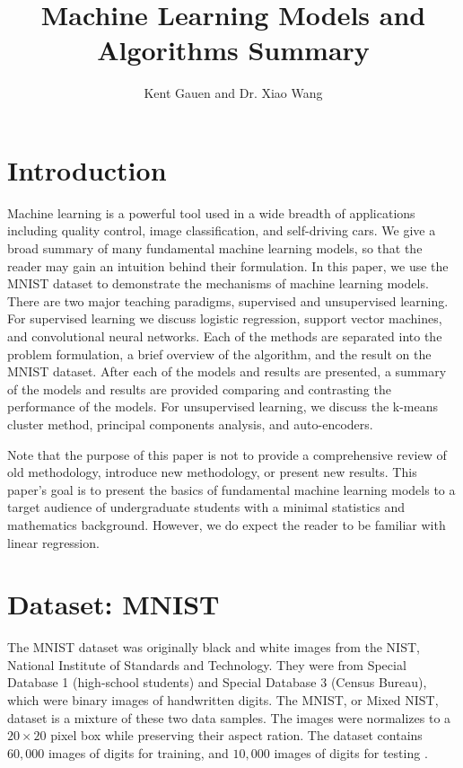 \message{ !name(main.tex)}\documentclass[11pt]{article}
\title{Machine Learning Models and Algorithms Summary}
\author{Kent Gauen and Dr. Xiao Wang}
\date{}
\begin{document}

\maketitle
\tableofcontents

\section{Introduction}
\par
    Machine learning is a powerful tool used in a wide breadth of applications including quality control, image classification, and self-driving cars. We give a broad summary of many fundamental machine learning models, so that the reader may gain an intuition behind their formulation. In this paper, we use the MNIST dataset to demonstrate the mechanisms of machine learning models. There are two major teaching paradigms, supervised and unsupervised learning. For supervised learning we discuss logistic regression, support vector machines, and convolutional neural networks. Each of the methods are separated into the problem formulation, a brief overview of the algorithm, and the result on the MNIST dataset. After each of the models and results are presented, a summary of the models and results are provided comparing and contrasting the performance of the models. For unsupervised learning, we discuss the k-means cluster method, principal components analysis, and auto-encoders.
\par
    Note that the purpose of this paper is not to provide a comprehensive review of old methodology, introduce new methodology, or present new results. This paper's goal is to present the basics of fundamental machine learning models to a target audience of undergraduate students with a minimal statistics and mathematics background. However, we do expect the reader to be familiar with linear regression.

\section{Dataset: MNIST}
The MNIST dataset was originally black and white images from the NIST, National Institute of Standards and Technology. They were from Special Database 1 (high-school students) and Special Database 3 (Census Bureau), which were binary images of handwritten digits. The MNIST, or Mixed NIST, dataset is a mixture of these two data samples. The images were normalizes to a $20\times20$ pixel box while preserving their aspect ration. The dataset contains $60,000$ images of digits for training, and $10,000$ images of digits for testing \cite{mnist_lecun}. 
\end{document}
